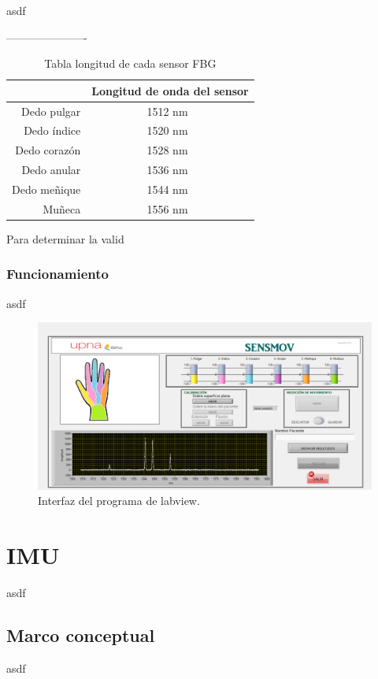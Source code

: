 asdf



----------------------

\begin{table}[H]
	\centering
	\begin{tabular}[t]{|r|c|}
		\hline
		 & Longitud de onda del sensor\\
		\hline
		\hline
		Dedo pulgar & 1512 nm \\
		\hline
		Dedo índice & 1520 nm \\
		\hline
		Dedo corazón & 1528 nm \\
		\hline
		Dedo anular & 1536 nm \\
		\hline
		Dedo meñique & 1544 nm \\
		\hline
		Muñeca & 1556 nm \\
		\hline
	\end{tabular}
	\caption{Tabla longitud de cada sensor FBG}
	\label{tabla:medidas 80 cm}
\end{table}


Para determinar la valid


\subsubsection{Funcionamiento}
asdf

\begin{figure}[H]
	\centering
	\includegraphics[width=1\textwidth]{./img/interfazSM}
	\caption{Interfaz del programa de labview.}
	\label{fig:interfaz}
\end{figure}

\section{IMU}
\label{sec:IMU3}
asdf

\subsection{Marco conceptual}
\label{sec:mc3IMU}
asdf

